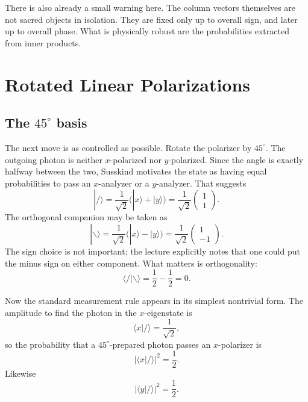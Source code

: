 There is also already a small warning here. The column vectors themselves are not sacred objects in isolation. They are fixed only up to overall sign, and later up to overall phase. What is physically robust are the probabilities extracted from inner products.

\section{Rotated Linear Polarizations}

\subsection{The \(45^\circ\) basis}

The next move is as controlled as possible. Rotate the polarizer by \(45^\circ\). The outgoing photon is neither \(x\)-polarized nor \(y\)-polarized. Since the angle is exactly halfway between the two, Susskind motivates the state as having equal probabilities to pass an \(x\)-analyzer or a \(y\)-analyzer. That suggests
\begin{equation}
|/\rangle=\frac{1}{\sqrt2}\bigl(|x\rangle+|y\rangle\bigr)
=
\frac{1}{\sqrt2}
\begin{pmatrix}
1\\
1
\end{pmatrix}.
\end{equation}
The orthogonal companion may be taken as
\begin{equation}
|\backslash\rangle=\frac{1}{\sqrt2}\bigl(|x\rangle-|y\rangle\bigr)
=
\frac{1}{\sqrt2}
\begin{pmatrix}
1\\
-1
\end{pmatrix}.
\end{equation}
The sign choice is not important; the lecture explicitly notes that one could put the minus sign on either component. What matters is orthogonality:
\begin{equation}
\langle /|\backslash\rangle
=
\frac12-\frac12
=
0.
\end{equation}

Now the standard measurement rule appears in its simplest nontrivial form. The amplitude to find the photon in the \(x\)-eigenstate is
\begin{equation}
\langle x|/\rangle=\frac{1}{\sqrt2},
\end{equation}
so the probability that a \(45^\circ\)-prepared photon passes an \(x\)-polarizer is
\begin{equation}
|\langle x|/\rangle|^2=\frac12.
\end{equation}
Likewise
\begin{equation}
|\langle y|/\rangle|^2=\frac12.
\end{equation}

